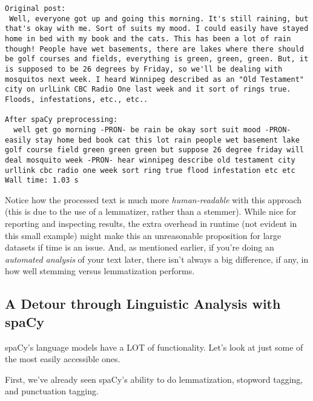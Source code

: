 \documentclass[11pt]{article}
\begin{document}
    \begin{Verbatim}[commandchars=\\\{\}]
Original post:
 Well, everyone got up and going this morning. It's still raining, but that's okay with me. Sort of suits my mood. I could easily have stayed home in bed with my book and the cats. This has been a lot of rain though! People have wet basements, there are lakes where there should be golf courses and fields, everything is green, green, green. But, it is supposed to be 26 degrees by Friday, so we'll be dealing with mosquitos next week. I heard Winnipeg described as an "Old Testament" city on urlLink CBC Radio One last week and it sort of rings true. Floods, infestations, etc., etc.. 

After spaCy preprocessing:
  well get go morning -PRON- be rain be okay sort suit mood -PRON- easily stay home bed book cat this lot rain people wet basement lake golf course field green green green but suppose 26 degree friday will deal mosquito week -PRON- hear winnipeg describe old testament city urllink cbc radio one week sort ring true flood infestation etc etc
Wall time: 1.03 s

    \end{Verbatim}

    Notice how the processed text is much more \emph{human-readable} with
this approach (this is due to the use of a lemmatizer, rather than a
stemmer). While nice for reporting and inspecting results, the extra
overhead in runtime (not evident in this small example) might make this
an unreasonable proposition for large datasets if time is an issue. And,
as mentioned earlier, if you're doing an \emph{automated analysis} of
your text later, there isn't always a big difference, if any, in how
well stemming versus lemmatization performs.

    \hypertarget{a-detour-through-linguistic-analysis-with-spacy}{%
\subsection{A Detour through Linguistic Analysis with
spaCy}\label{a-detour-through-linguistic-analysis-with-spacy}}

spaCy's language models have a LOT of functionality. Let's look at just
some of the most easily accessible ones.

First, we've already seen spaCy's ability to do lemmatization, stopword
tagging, and punctuation tagging.
\end{document}
